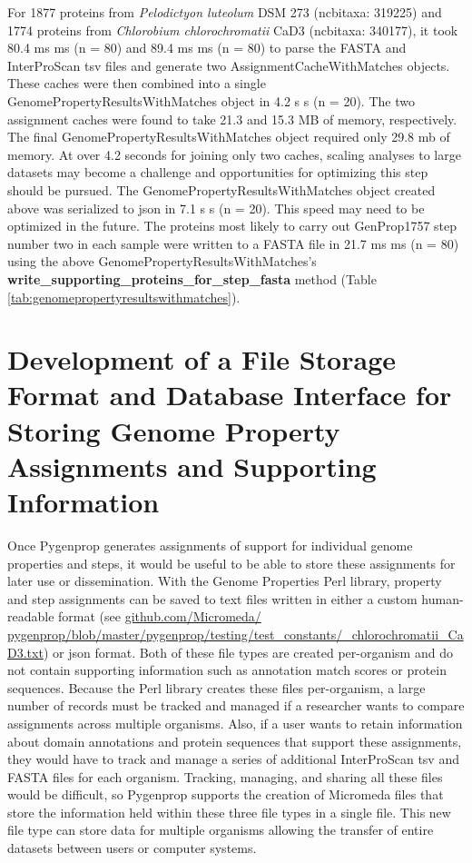 For 1877 proteins from \textit{Pelodictyon luteolum} DSM 273 (\gls{ncbitaxa}: 319225) and 1774 proteins from \textit{Chlorobium chlorochromatii} CaD3 (\gls{ncbitaxa}: 340177), it took 80.4 ms  ms (\gls{n} = 80) and 89.4 ms  ms (\gls{n} = 80) to parse the FASTA and InterProScan \gls{tsv} files and generate two AssignmentCacheWithMatches objects. These caches were then combined into a single GenomePropertyResultsWithMatches object in 4.2 s  s (\gls{n} = 20). The two assignment caches were found to take 21.3 and 15.3 MB of memory, respectively. The final GenomePropertyResultsWithMatches object required only 29.8 \gls{mb} of memory. At over 4.2 seconds for joining only two caches, scaling analyses to large datasets may become a challenge and opportunities for optimizing this step should be pursued. The GenomePropertyResultsWithMatches object created above was serialized to \gls{json} in 7.1 s  s (\gls{n} = 20). This speed may need to be optimized in the future. The proteins most likely to carry out GenProp1757 step number two in each sample were written to a FASTA file in 21.7 ms  ms (\gls{n} = 80) using the above GenomePropertyResultsWithMatches's \textbf{write\_supporting\_proteins\_for\_step\_fasta} method (Table \ref{tab:genomepropertyresultswithmatches}).

\section{Development of a File Storage Format and Database Interface for Storing Genome Property Assignments and Supporting Information} \label{MicromedaFiles}

Once Pygenprop generates assignments of support for individual genome properties and steps, it would be useful to be able to store these assignments for later use or dissemination. With the Genome Properties Perl library, property and step assignments can be saved to text files written in either a custom human-readable format (see \href{http://github.com/Micromeda/pygenprop/blob/master/pygenprop/testing/test_constants/C_chlorochromatii_CaD3.txt}{github.com/Micromeda/ pygenprop/blob/master/pygenprop/testing/test\_constants/\_chlorochromatii\_CaD3.txt}) or \gls{json} format. Both of these file types are created per-organism and do not contain supporting information such as annotation match scores or protein sequences. Because the Perl library creates these files per-organism, a large number of records must be tracked and managed if a researcher wants to compare assignments across multiple organisms. Also, if a user wants to retain information about domain annotations and protein sequences that support these assignments, they would have to track and manage a series of additional InterProScan \gls{tsv} and FASTA files for each organism. Tracking, managing, and sharing all these files would be difficult, so Pygenprop supports the creation of Micromeda files that store the information held within these three file types in a single file. This new file type can store data for multiple organisms allowing the transfer of entire datasets between users or computer systems.

